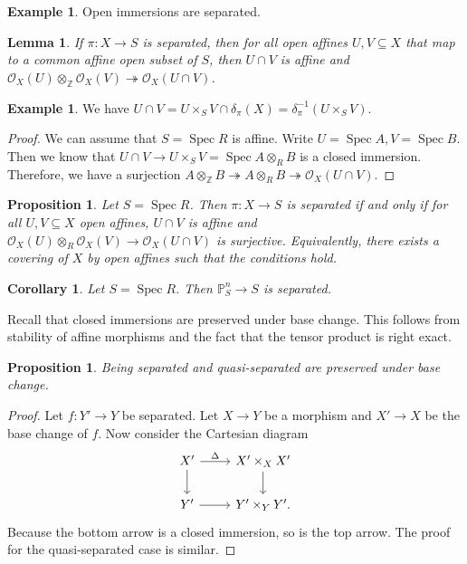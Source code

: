 \documentclass[leqno, openany]{memoir}
\newtheorem{cor}[thm]{Corollary}
\newtheorem{prop}[thm]{Proposition}
\newtheorem{lem}[thm]{Lemma}
\theoremstyle{definition}
\newtheorem{exm}[thm]{Example}
\theoremstyle{remark}
\theoremstyle{plain}
\theoremstyle{definition}
\theoremstyle{remark}
\newcommand{\Z}{\mathbb{Z}}
\renewcommand{\P}{\mathbb{P}}
\newcommand{\msc}[1]{\mathscr{#1}}
\DeclareMathOperator{\Spec}{Spec}
\begin{document}
\begin{exm}
    Open immersions are separated.
\end{exm}

\begin{lem}
    If $\pi \colon X \to S$ is separated, then for all open affines $U, V \subseteq X$ that map to a common affine open subset of $S$, then $U \cap V$ is affine and $\msc{O}_X(U) \otimes_{\Z} \msc{O}_X(V) \twoheadrightarrow \msc{O}_X(U \cap V)$.
\end{lem}

\begin{exm}
    We have $U \cap V = U \times_S V \cap \delta_{\pi}(X) = \delta_{\pi}^{-1}(U \times_S V)$.
\end{exm}

\begin{proof}
    We can assume that $S = \Spec R$ is affine. Write $U = \Spec A, V = \Spec B$. Then we know that $U \cap V \to U \times_S V = \Spec A \otimes_R B$ is a closed immersion. Therefore, we have a surjection $A \otimes_{\Z} B \twoheadrightarrow A \otimes_R B \twoheadrightarrow \msc{O}_X(U \cap V)$.
\end{proof}

\begin{prop}
    Let $S = \Spec R$. Then $\pi \colon X \to S$ is separated if and only if for all $U, V \subseteq X$ open affines, $U \cap V$ is affine and $\msc{O}_X(U) \otimes_R \msc{O}_X(V) \to \msc{O}_X(U \cap V)$ is surjective. Equivalently, there exists a covering of $X$ by open affines such that the conditions hold.
\end{prop}

\begin{cor}
    Let $S = \Spec R$. Then $\P^n_S \to S$ is separated.
\end{cor}

Recall that closed immersions are preserved under base change. This follows from stability of affine morphisms and the fact that the tensor product is right exact. 

\begin{prop}
    Being separated and quasi-separated are preserved under base change. 
\end{prop}

\begin{proof}
    Let $f \colon Y' \to Y$ be separated. Let $X \to Y$ be a morphism and $X' \to X$ be the base change of $f$. Now consider the Cartesian diagram
    \begin{equation*}
    \begin{tikzcd}
        X' \ar{r}{\Delta} \ar{d} & X' \times_X X' \ar{d} \\
        Y' \ar{r} & Y' \times_Y Y'.
    \end{tikzcd}
    \end{equation*}
    Because the bottom arrow is a closed immersion, so is the top arrow. The proof for the quasi-separated case is similar.
\end{proof}
\end{document}
